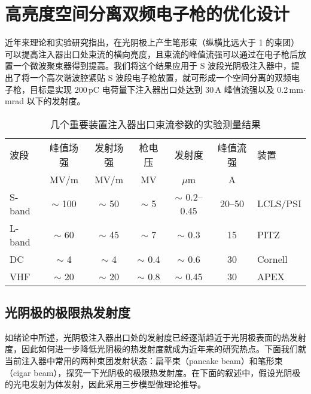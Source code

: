\chapter{高亮度空间分离双频电子枪的优化设计}
\label{chap:GA}
近年来理论和实验研究指出，在光阴极上产生笔形束（纵横比远大于 1 的束团）可以提高注入器出口处束流的横向亮度，且束流的峰值流强可以通过在电子枪后放置一个微波聚束器得到提高。我们将这个结果应用于 S 波段光阴极注入器中，提出了将一个高次谐波腔紧贴 S 波段电子枪放置，就可形成一个空间分离的双频电子枪，目标是实现 200\,pC 电荷量下注入器出口处达到 30\,A 峰值流强以及 0.2\,mm$\cdot$mrad 以下的发射度。

\begin{table}[htbp]
\caption{几个重要装置注入器出口束流参数的实验测量结果}
\centering
\begin{tabular}{lcccccl}
\toprule
波段 & 峰值场强 & 发射场强 & 枪电压 & 发射度 & 峰值流强 & 装置 \\
 & MV/m & MV/m & MV & $\mu$m & A & \\
\midrule
S-band & $\sim$ 100 & $\sim$ 50 & $\sim$ 5 & $\sim$ 0.2--0.45 & 20--50 & LCLS/PSI \\
L-band & $\sim$ 60 & $\sim$ 45 & $\sim$ 7 & $\sim$ 0.3 & 15 & PITZ \\
DC & $\sim$ 4 & $\sim$ 4 & $\sim$ 0.4 & $\sim$ 0.6 & 30 & Cornell \\
VHF & $\sim$ 20 & $\sim$ 20 & $\sim$ 0.8 & $\sim$ 0.45 & 30 & APEX \\
\bottomrule
\end{tabular}
\end{table}

\section{光阴极的极限热发射度}
如绪论中所述，光阴极注入器出口处的发射度已经逐渐趋近于光阴极表面的热发射度，因此如何进一步降低光阴极的热发射度就成为近年来的研究热点。下面我们就当前注入器中常用的两种束团发射状态：扁平束（pancake beam）和笔形束（cigar beam），探究一下光阴极的极限热发射度。在下面的叙述中，假设光阴极的光电发射为体发射，因此采用三步模型做理论推导。

